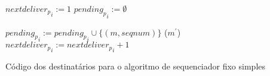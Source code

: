 \begin{algorithm}
\DontPrintSemicolon
{}

${{nextdeliver}_p}_{i} := 1$\;
${{pending}_p}_{i} := \emptyset$\;

 {
  ${{pending}_p}_{i} := {{pending}_p}_{i} \cup \{(m, seqnum)\}$\;
   {
    (${m}^{\prime}$)\;
    ${{nextdeliver}_p}_{i} := {{nextdeliver}_p}_{i} + 1$\;
  }
}
\caption{Código dos destinatários para o algoritmo de sequenciador fixo simples}
\label{algo:simple-fixed-sequencer-destinations}
\end{algorithm}
